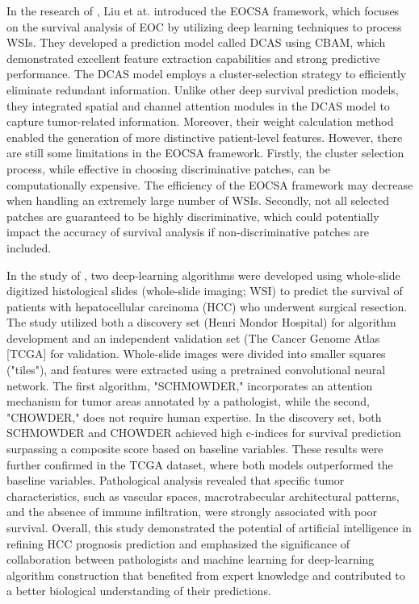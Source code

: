 \documentclass[journal,twoside,web]{ieeecolor}
\begin{document}
In the research of \cite{liu2022eocsa}, Liu et at. introduced the EOCSA framework, which focuses on the survival analysis of EOC by utilizing deep learning techniques to process WSIs. 
They developed a prediction model called DCAS using CBAM\cite{woo2018cbam}, which demonstrated excellent feature extraction capabilities and strong predictive performance. 
The DCAS model employs a cluster-selection strategy to efficiently eliminate redundant information. 
Unlike other deep survival prediction models, they integrated spatial and channel attention modules in the DCAS model to capture tumor-related information. 
Moreover, their weight calculation method enabled the generation of more distinctive patient-level features. 
However, there are still some limitations in the EOCSA framework. 
Firstly, the cluster selection process, while effective in choosing discriminative patches, can be computationally expensive. 
The efficiency of the EOCSA framework may decrease when handling an extremely large number of WSIs. Secondly, not all selected patches are guaranteed to be highly discriminative, which could potentially impact the accuracy of survival analysis if non-discriminative patches are included. 

In the study of \cite{saillard2020predicting}, two deep-learning algorithms were developed using whole-slide digitized histological slides (whole-slide imaging; WSI) to predict the survival of patients with hepatocellular carcinoma (HCC) who underwent surgical resection. 
The study utilized both a discovery set (Henri Mondor Hospital) for algorithm development and an independent validation set (The Cancer Genome Atlas [TCGA] for validation. 
Whole-slide images were divided into smaller squares ("tiles"), and features were extracted using a pretrained convolutional neural network. 
The first algorithm, "SCHMOWDER," incorporates an attention mechanism for tumor areas annotated by a pathologist, while the second, "CHOWDER," does not require human expertise.
In the discovery set, both SCHMOWDER and CHOWDER achieved high c-indices for survival prediction surpassing a composite score based on baseline variables. 
These results were further confirmed in the TCGA dataset, where both models outperformed the baseline variables. 
Pathological analysis revealed that specific tumor characteristics, such as vascular spaces, macrotrabecular architectural patterns, and the absence of immune infiltration, were strongly associated with poor survival. 
Overall, this study demonstrated the potential of artificial intelligence in refining HCC prognosis prediction and emphasized the significance of collaboration between pathologists and machine learning for deep-learning algorithm construction that benefited from expert knowledge and contributed to a better biological understanding of their predictions.
\end{document}
